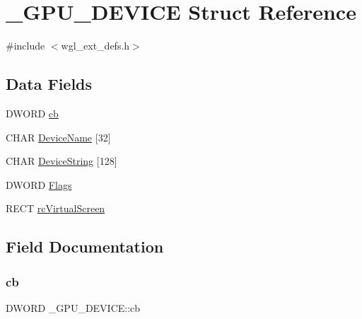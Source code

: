 \hypertarget{struct___g_p_u___d_e_v_i_c_e}{}\section{\+\_\+\+G\+P\+U\+\_\+\+D\+E\+V\+I\+CE Struct Reference}
\label{struct___g_p_u___d_e_v_i_c_e}


{\ttfamily \#include $<$wgl\+\_\+ext\+\_\+defs.\+h$>$}

\subsection*{Data Fields}
\begin{DoxyCompactItemize}
\item 
D\+W\+O\+RD \hyperlink{struct___g_p_u___d_e_v_i_c_e_afcb22f16ba9e526610489ff56ab78ddb}{cb}
\item 
C\+H\+AR \hyperlink{struct___g_p_u___d_e_v_i_c_e_a604bfab61f1a2c5d1e635837d369ba14}{Device\+Name} \mbox{[}32\mbox{]}
\item 
C\+H\+AR \hyperlink{struct___g_p_u___d_e_v_i_c_e_aff8b7920ccc85afcd6f325da6cdb0b73}{Device\+String} \mbox{[}128\mbox{]}
\item 
D\+W\+O\+RD \hyperlink{struct___g_p_u___d_e_v_i_c_e_a008db9d0f5fc13a5160805f40465f14a}{Flags}
\item 
R\+E\+CT \hyperlink{struct___g_p_u___d_e_v_i_c_e_aeb573bbeb3b6c589246720ef259b9a27}{rc\+Virtual\+Screen}
\end{DoxyCompactItemize}


\subsection{Field Documentation}
\mbox{\label{struct___g_p_u___d_e_v_i_c_e_afcb22f16ba9e526610489ff56ab78ddb}} 
\subsubsection{\texorpdfstring{cb}{cb}}
{\footnotesize\ttfamily D\+W\+O\+RD \+\_\+\+G\+P\+U\+\_\+\+D\+E\+V\+I\+C\+E\+::cb}

\mbox{\label{struct___g_p_u___d_e_v_i_c_e_a604bfab61f1a2c5d1e635837d369ba14}} 
